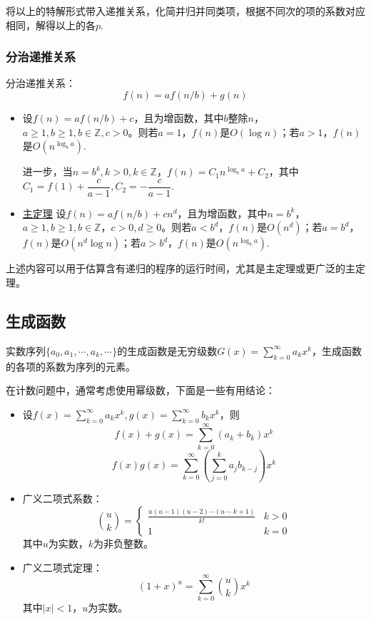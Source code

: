 将以上的特解形式带入递推关系，化简并归并同类项，根据不同次的项的系数对应相同，解得以上的各$p$.

\subsubsection*{分治递推关系}
分治递推关系：
\[f(n) = af(n/b) + g(n)\]
\begin{itemize}
    \item 设$f(n) = af(n/b) + c$，且为增函数，其中$b$整除$n$，$a \ge 1,b \ge 1,b \in \mathbb Z,c > 0$。则若$a = 1$，$f(n)$是$O(\log n)$；若$a > 1$，$f(n)$是$O(n^{\log_b a})$.

    进一步，当$n = b^k, k > 0,k \in \mathbb Z$，$f(n) = C_1 n^{\log_b a} + C_2$，其中$C_1 = f(1) + \dfrac c{a-1}, C_2 = -\dfrac c{a-1}$.

    \item \uline{主定理} 设$f(n) = af(n/b) + cn^d$，且为增函数，其中$n = b^k$，$a \ge 1,b \ge 1,b \in \mathbb Z$，$c > 0,d \ge 0$。则若$a < b^d$，$f(n)$是$O(n^d)$；若$a = b^d$，$f(n)$是$O(n^d \log n)$；若$a > b^d$，$f(n)$是$O(n^{\log_b a})$.
\end{itemize}

上述内容可以用于估算含有递归的程序的运行时间，尤其是主定理或更广泛的主定理。

\subsection{生成函数}
实数序列$\{a_0, a_1, \cdots, a_k, \cdots \}$的生成函数是无穷级数$G(x) = \displaystyle \sum_{k=0}^{\infty} a_k x^k$，生成函数的各项的系数为序列的元素。

在计数问题中，通常考虑使用幂级数，下面是一些有用结论：
\begin{itemize}
    \item 设$f(x) = \displaystyle \sum_{k=0}^\infty a_k x^k, g(x) = \displaystyle \sum_{k=0}^\infty b_k x^k$，则
    \[f(x) + g(x) = \sum_{k=0}^\infty (a_k + b_k) x^k\]
    \[f(x)g(x) = \sum_{k=0}^\infty (\sum_{j=0}^k a_j b_{k-j}) x^k\]
    \item 广义二项式系数：
    \[\binom uk= 
    \begin{cases} \displaystyle \frac {u(u-1)(u-2) \cdots (u-k+1)}{k!} & k > 0 \\
    1 & k = 0
    \end{cases}\]
    其中$u$为实数，$k$为非负整数。
    \item 广义二项式定理：
    \[(1+x)^u = \sum_{k = 0}^\infty \binom uk x^k\]
    其中$\lvert x \rvert < 1$，$u$为实数。
\end{itemize}


